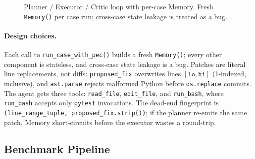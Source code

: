 \documentclass[11pt,letterpaper]{article}
\begin{document}
\begin{figure}[H]
\caption{Planner / Executor / Critic loop with per-case Memory. Fresh \texttt{Memory()} per case run; cross-case state leakage is treated as a bug.}
\label{fig:pec}
\end{figure}

\paragraph{Design choices.} Each call to \texttt{run\_case\_with\_pec()} builds a fresh \texttt{Memory()}; every other component is stateless, and cross-case state leakage is a bug. Patches are literal line replacements, not diffs: \texttt{proposed\_fix} overwrites lines $[\texttt{lo},\texttt{hi}]$ (1-indexed, inclusive), and \texttt{ast.parse} rejects malformed Python before \texttt{os.replace} commits. The agent gets three tools: \texttt{read\_file}, \texttt{edit\_file}, and \texttt{run\_bash}, where \texttt{run\_bash} accepts only \texttt{pytest} invocations. The dead-end fingerprint is \texttt{(line\_range\_tuple, proposed\_fix.strip())}; if the planner re-emits the same patch, Memory short-circuits before the executor wastes a round-trip.

\subsection{Benchmark Pipeline}
\end{document}

